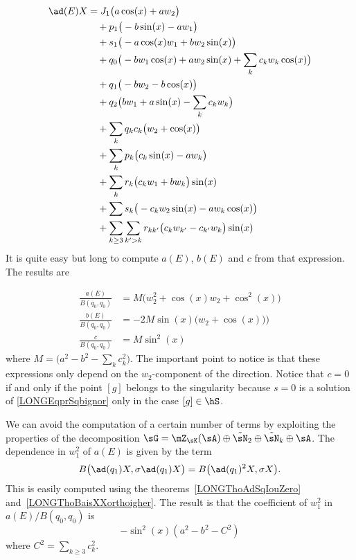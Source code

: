 \begin{equation}
    \begin{aligned}[]
        \ad(E)X    & = J_1\big( a\cos(x)+aw_2 \big)\\
            &\quad +  p_1\big( -b\sin(x)-aw_1 \big)\\
            &\quad+  s_1\big( -a\cos(x)w_1+bw_2\sin(x) \big)\\
            &\quad  +  q_0\big( -bw_1\cos(x)+aw_2\sin(x)+\sum_{k}c_kw_k\cos(x) \big)\\
            &\quad +  q_1\big( -bw_2-b\cos(x) \big)\\
            &\quad +  q_2\big( bw_1+a\sin(x)-\sum_kc_kw_k \big)\\
            &\quad +  \sum_kq_kc_k\big( w_2+\cos(x) \big)\\
            &\quad +  \sum_kp_k\big( c_k\sin(x)-aw_k \big)\\
            &\quad +  \sum_k r_k\big( c_kw_1+bw_k \big)\sin(x)\\
            &\quad +  \sum s_k\big( -c_kw_2\sin(x)-aw_k\cos(x) \big)\\
            &\quad + \sum_{k\geq 3}\sum_{k'>k} r_{kk'}\big( c_kw_{k'}-c_{k'}w_k \big)\sin(x)
    \end{aligned}
\end{equation}
It is quite easy but long to compute $a(E)$, $b(E)$ and $c$ from that expression. The results are
%

\begin{subequations}\label{LONGEqCoefsabcBE}
    \begin{align}
        \frac{ a(E) }{ B(q_0,q_0) }&=M\Big( w_2^2+\cos(x)w_2+\cos^2(x)\Big)       \label{LONGEqCoeffaE}\\
        \frac{ b(E) }{ B(q_0,q_0) }&=-2M\sin(x)\big( w_2+\cos(x)\big))\\
        \frac{ c }{ B(q_0,q_0) }&=M\sin^2(x)
    \end{align}
\end{subequations}
where $M=\big( a^2-b^2-\sum_kc_k^2 \big)$. The important point to notice is that these expressions only depend on the $w_2$-component of the direction. Notice that $c=0$ if and only if the point $[g]$ belongs to the singularity because $s=0$ is a solution of \eqref{LONGEqprSqbignor} only in the case $[g]\in\hS$.

%
We can avoid the computation of a certain number of terms by exploiting the properties of the decomposition $\sG=\mZ_{\sK}(\sA)\oplus\tilde\sN_2\oplus\tilde\sN_k\oplus\sA$. The dependence in $w_1^2$ of $a(E)$ is given by the term
\begin{equation}
    B\big( \ad(q_1)X,\sigma\ad(q_1)X \big)=B\big( \ad(q_1)^2X,\sigma X \big).
\end{equation}
This is easily computed using the theorems~\ref{LONGThoAdSqIouZero} and~\ref{LONGThoBaisXXorthoigher}. The result is that the coefficient of $w_1^2$ in $a(E)/B(q_0,q_0)$ is
\begin{equation}
    -\sin^2(x)(a^2-b^2- C^2)
\end{equation}
where $C^2=\sum_{k\geq 3}c_k^2$.

